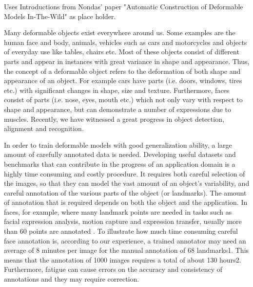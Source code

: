 Uses Introductions from Nondas' paper "Automatic Construction of Deformable Models In-The-Wild" as place holder.

Many deformable objects exist everywhere around us.
Some examples are the human face and body, animals, vehicles
such as cars and motorcycles and objects of everyday
use like tables, chairs etc. Most of these objects consist of
different parts and appear in instances with great variance
in shape and appearance. Thus, the concept of a deformable
object refers to the deformation of both shape and appearance
of an object. For example cars have parts (i.e. doors,
windows, tires etc.) with significant changes in shape, size
and texture. Furthermore, faces consist of parts (i.e. nose,
eyes, mouth etc.) which not only vary with respect to shape
and appearance, but can demonstrate a number of expressions
due to muscles. Recently, we have witnessed a great
progress in object detection, alignment and recognition.

In order to train deformable models with good generalization
ability, a large amount of carefully annotated data
is needed. Developing useful datasets and benchmarks that
can contribute in the progress of an application domain is
a highly time consuming and costly procedure. It requires
both careful selection of the images, so that they can model
the vast amount of an object’s variability, and careful annotation
of the various parts of the object (or landmarks).
The amount of annotation that is required depends on both
the object and the application. In faces, for example, where
many landmark points are needed in tasks such as facial expression
analysis, motion capture and expression transfer,
usually more than 60 points are annotated \cite{?}.
To illustrate how much time consuming careful face annotation
is, according to our experience, a trained annotator
may need an average of 8 minutes per image for the manual
annotation of 68 landmarks1. This means that the annotation
of 1000 images requires a total of about 130 hours2.
Furthermore, fatigue can cause errors on the accuracy and
consistency of annotations and they may require correction.

